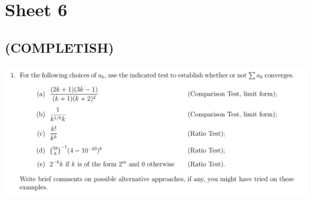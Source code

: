 \documentclass[12pt]{article}
\begin{document}


\section{Sheet 6}

\subsection{(COMPLETISH)}
\begin{mdframed}
\includegraphics[width=400pt]{img/analysis--oxford-M2-I-6-1.png}
\end{mdframed}
\end{document}
